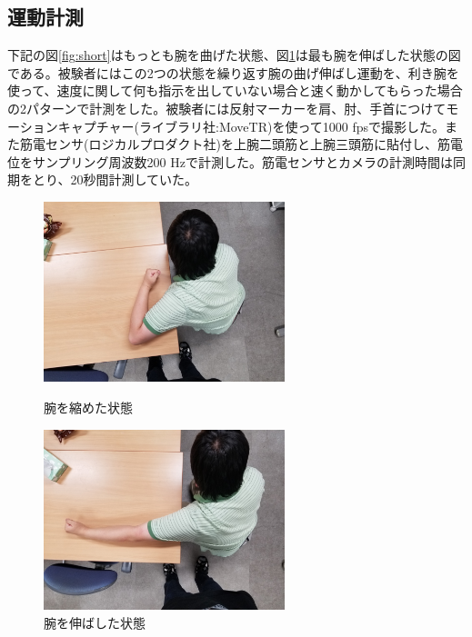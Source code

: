 \documentclass{jsarticle}
\begin{document}
\subsection{運動計測}
下記の図\ref{fig:short}はもっとも腕を曲げた状態、図\ref{fig:long}は最も腕を伸ばした状態の図である。被験者にはこの2つの状態を繰り返す腕の曲げ伸ばし運動を、利き腕を使って、速度に関して何も指示を出していない場合と速く動かしてもらった場合の2パターンで計測をした。被験者には反射マーカーを肩、肘、手首につけてモーションキャプチャー(ライブラリ社:MoveTR)を使って1000 fpsで撮影した。また筋電センサ(ロジカルプロダクト社)を上腕二頭筋と上腕三頭筋に貼付し、筋電位をサンプリング周波数200 Hzで計測した。筋電センサとカメラの計測時間は同期をとり、20秒間計測していた。
\begin{figure}[h]
  \begin{minipage}{0.5\hsize}
    \begin{center}
      \includegraphics[width=7cm]{images/short.jpg}
    \end{center}
    \caption{腕を縮めた状態}
    \label{fig:short}
  \end{minipage}
  \begin{minipage}{0.5\hsize}
    \begin{center}
      \includegraphics[width=7cm]{images/long.jpg}
    \end{center}
    \caption{腕を伸ばした状態}
    \label{fig:long}
  \end{minipage}
\end{figure}
\end{document}
